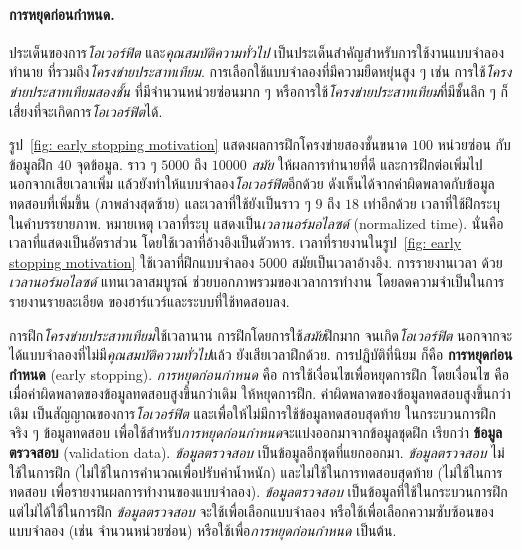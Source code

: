 \paragraph{การหยุดก่อนกำหนด.}
%
ประเด็นของการ\textit{โอเวอร์ฟิต} และ\textit{คุณสมบัติความทั่วไป} 
เป็นประเด็นสำคัญสำหรับการใช้งานแบบจำลองทำนาย ที่รวมถึง\textit{โครงข่ายประสาทเทียม}.
การเลือกใช้แบบจำลองที่มีความยืดหยุ่นสูง ๆ เช่น
การใช้\textit{โครงข่ายประสาทเทียมสองชั้น}
ที่มีจำนวนหน่วยซ่อนมาก ๆ
หรือการใช้\textit{โครงข่ายประสาทเทียม}ที่มีชั้นลึก ๆ
ก็เสี่ยงที่จะเกิดการ\textit{โอเวอร์ฟิต}ได้. 

รูป~\ref{fig: early stopping motivation}
แสดงผลการฝึกโครงข่ายสองชั้นขนาด $100$ หน่วยซ่อน กับข้อมูลฝึก $40$ จุดข้อมูล.
ราว ๆ $5000$ ถึง $10000$ \textit{สมัย} ให้ผลการทำนายที่ดี และการฝึกต่อเพิ่มไป
นอกจากเสียเวลาเพิ่ม แล้วยังทำให้แบบจำลอง\textit{โอเวอร์ฟิต}อีกด้วย
ดังเห็นได้จากค่าผิดพลาดกับข้อมูลทดสอบที่เพิ่มขึ้น (ภาพล่างสุดซ้าย)
และเวลาที่ใช้ยังเป็นราว ๆ $9$ ถึง $18$ เท่าอีกด้วย เวลาที่ใช้ฝึกระบุในคำบรรยายภาพ.
หมายเหตุ เวลาที่ระบุ แสดงเป็น\textit{เวลานอร์มอไลซด์} (normalized time). 
%
นั่นคือ เวลาที่แสดงเป็นอัตราส่วน โดยใช้เวลาที่อ้างอิงเป็นตัวหาร.
เวลาที่รายงานในรูป~\ref{fig: early stopping motivation}
ใช้เวลาที่ฝึกแบบจำลอง $5000$ สมัยเป็นเวลาอ้างอิง.
การรายงานเวลา ด้วย\textit{เวลานอร์มอไลซด์} แทนเวลาสมบูรณ์ ช่วยบอกภาพรวมของเวลาการทำงาน โดยลดความจำเป็นในการรายงานรายละเอียด
ของฮาร์แวร์และระบบที่ใช้ทดสอบลง.

การฝึก\textit{โครงข่ายประสาทเทียม}ใช้เวลานาน
การฝึกโดยการใช้\textit{สมัย}ฝึกมาก จนเกิด\textit{โอเวอร์ฟิต}
นอกจากจะได้แบบจำลองที่ไม่มี\textit{คุณสมบัติความทั่วไป}แล้ว
ยังเสียเวลาฝึกด้วย.
การปฏิบัติที่นิยม ก็คือ \textbf{การหยุดก่อนกำหนด} (early stopping).
\textit{การหยุดก่อนกำหนด} คือ
การใช้เงื่อนไขเพื่อหยุดการฝึก
โดยเงื่อนไข 
คือเมื่อค่าผิดพลาดของข้อมูลทดสอบสูงขึ้นกว่าเดิม
ให้หยุดการฝึก.
ค่าผิดพลาดของข้อมูลทดสอบสูงขึ้นกว่าเดิม เป็นสัญญาณของการ\textit{โอเวอร์ฟิต}
และเพื่อให้ไม่มีการใช้ข้อมูลทดสอบสุดท้าย ในกระบวนการฝึกจริง ๆ
ข้อมูลทดสอบ เพื่อใช้สำหรับ\textit{การหยุดก่อนกำหนด}จะแบ่งออกมาจากข้อมูลชุดฝึก เรียกว่า \textbf{ข้อมูลตรวจสอบ} (validation data).
\textit{ข้อมูลตรวจสอบ} 
เป็นข้อมูลอีกชุดที่แยกออกมา.
\textit{ข้อมูลตรวจสอบ} ไม่ใช้ในการฝึก (ไม่ใช้ในการคำนวณเพื่อปรับค่าน้ำหนัก)
และไม่ใช้ในการทดสอบสุดท้าย 
(ไม่ใช้ในการทดสอบ เพื่อรายงานผลการทำงานของแบบจำลอง).
\textit{ข้อมูลตรวจสอบ}
เป็นข้อมูลที่ใช้ในกระบวนการฝึก แต่ไม่ได้ใช้ในการฝึก
\textit{ข้อมูลตรวจสอบ} จะใช้เพื่อเลือกแบบจำลอง หรือใช้เพื่อเลือกความซับซ้อนของแบบจำลอง (เช่น จำนวนหน่วยซ่อน)
หรือใช้เพื่อ\textit{การหยุดก่อนกำหนด} เป็นต้น.

